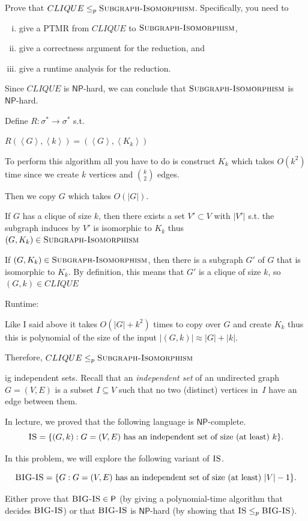 \documentclass[12pt, letterpaper]{article}
\renewcommand{\P}{\mathsf{P}}
\newcommand{\NP}{\mathsf{NP}}
\newcommand{\ang}[1]{\left\langle #1 \right\rangle}
\begin{document}
\begin{subproblem}{}
    Prove that $CLIQUE \leq_p \textsc{Subgraph-Isomorphism}$. Specifically, you need to 
            \begin{enumerate}[(i)]
                \item give a PTMR from $CLIQUE$ to $\textsc{Subgraph-Isomorphism}$,
                \item give a correctness argument for the reduction, and
                \item give a runtime analysis for the reduction.
            \end{enumerate}
            Since $CLIQUE$ is $\NP$-hard, we can conclude that $\textsc{Subgraph-Isomorphism}$ is $\NP$-hard. 
\end{subproblem}
\begin{problemproof}
    Define $R : \sigma^* \to \sigma^*$ s.t.

    $R(\ang{G},\ang{k})=(\ang{G},\ang{K_k})$

    To perform this algorithm all you have to do is construct $K_k$ which takes $O(k^2)$ time since we create $k$ vertices and $\binom{k}{2}$ edges.

    Then we copy $G$ which takes $O(|G|)$.

    If $G$ has a clique of size $k$, then there exists a set $V' \subset V$ with $|V'|$ s.t. the subgraph induces by $V'$ is isomorphic to $K_k$ thus $(G,K_k) \in \textsc{Subgraph-Isomorphism}$
    
    If $(G,K_k) \in \textsc{Subgraph-Isomorphism}$, then there is a subgraph $G'$ of $G$ that is isomorphic to $K_k$. By definition, this means that $G'$ is a clique of size $k$, so $(G,k) \in CLIQUE$

    Runtime:

    Like I said above it takes $O(|G|+k^2)$ times to copy over $G$ and create $K_k$ thus this is polynomial of the size of the input $|(G,k)| \approx |G| + |k|$.

    Therefore, $CLIQUE \leq_p \textsc{Subgraph-Isomorphism}$
\end{problemproof}
\newcommand{\IS}{\textsc{IS}}
\begin{problem}{ig independent sets.}
    Recall that an \emph{independent set} of an undirected graph $G=(V,E)$ is a subset $I \subseteq V$ such that no two (distinct) vertices in~$I$ have an edge between them.

  In lecture, we proved that the following language is $\NP$-complete.
  \[
    \IS = \set{(G,k) : G = (V,E) \text{ has an independent set of size (at least) } k} .
  \]

  In this problem, we will explore the following variant of $\IS$. 

    \newcommand{\BigIS}{\textsc{BIG-IS}}
    \[
      \BigIS = \set{ G : G=(V,E) \text{ has an independent set of size (at least) } |V|-1 } .
    \]
  
    Either prove that $\BigIS\in \P$ (by giving a polynomial-time algorithm that decides $\BigIS$) or that $\BigIS$ is $\NP$-hard (by showing that $\IS \ptimemap \BigIS$).
\end{problem}
\end{document}
